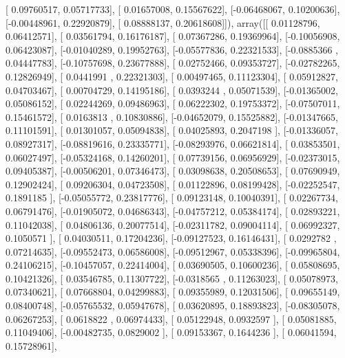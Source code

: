 \documentclass{article}
\begin{document}
       [ 0.09760517,  0.05717733],
       [ 0.01657008,  0.15567622],
       [-0.06468067,  0.10200636],
       [-0.00448961,  0.22920879],
       [ 0.08888137,  0.20618608]]), array([[ 0.01128796,  0.06412571],
       [ 0.03561794,  0.16176187],
       [ 0.07367286,  0.19369964],
       [-0.10056908,  0.06423087],
       [-0.01040289,  0.19952763],
       [-0.05577836,  0.22321533],
       [-0.0885366 ,  0.04447783],
       [-0.10757698,  0.23677888],
       [ 0.02752466,  0.09353727],
       [-0.02782265,  0.12826949],
       [ 0.0441991 ,  0.22321303],
       [ 0.00497465,  0.11123304],
       [ 0.05912827,  0.04703467],
       [ 0.00704729,  0.14195186],
       [ 0.0393244 ,  0.05071539],
       [-0.01365002,  0.05086152],
       [ 0.02244269,  0.09486963],
       [ 0.06222302,  0.19753372],
       [-0.07507011,  0.15461572],
       [ 0.0163813 ,  0.10830886],
       [-0.04652079,  0.15525882],
       [-0.01347665,  0.11101591],
       [ 0.01301057,  0.05094838],
       [ 0.04025893,  0.2047198 ],
       [-0.01336057,  0.08927317],
       [-0.08819616,  0.23335771],
       [-0.08293976,  0.06621814],
       [ 0.03853501,  0.06027497],
       [-0.05324168,  0.14260201],
       [ 0.07739156,  0.06956929],
       [-0.02373015,  0.09405387],
       [-0.00506201,  0.07346473],
       [ 0.03098638,  0.20508653],
       [ 0.07690949,  0.12902424],
       [ 0.09206304,  0.04723508],
       [ 0.01122896,  0.08199428],
       [-0.02252547,  0.1891185 ],
       [-0.05055772,  0.23817776],
       [ 0.09123148,  0.10040391],
       [ 0.02267734,  0.06791476],
       [-0.01905072,  0.04686343],
       [-0.04757212,  0.05384174],
       [ 0.02893221,  0.11042038],
       [ 0.04806136,  0.20077514],
       [-0.02311782,  0.09004114],
       [ 0.06992327,  0.1050571 ],
       [ 0.04030511,  0.17204236],
       [-0.09127523,  0.16146431],
       [ 0.0292782 ,  0.07214635],
       [-0.09552473,  0.06586008],
       [-0.09512967,  0.05338396],
       [-0.09965804,  0.24106215],
       [-0.10457057,  0.22414004],
       [ 0.03690505,  0.10600236],
       [ 0.05808695,  0.10421326],
       [ 0.03546785,  0.11307722],
       [-0.0318565 ,  0.11263023],
       [ 0.05078973,  0.07340621],
       [ 0.07668804,  0.04299883],
       [ 0.09355989,  0.12031506],
       [ 0.09655149,  0.08400748],
       [-0.05765532,  0.05947678],
       [ 0.03620895,  0.18893823],
       [-0.08305078,  0.06267253],
       [ 0.0618822 ,  0.06974433],
       [ 0.05122948,  0.0932597 ],
       [ 0.05081885,  0.11049406],
       [-0.00482735,  0.0829002 ],
       [ 0.09153367,  0.1644236 ],
       [ 0.06041594,  0.15728961],
\end{document}
